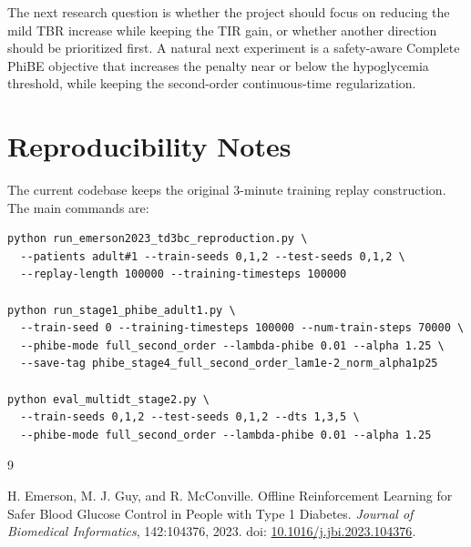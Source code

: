 \documentclass[11pt]{article}
\begin{document}
The next research question is whether the project should focus on reducing the mild TBR
increase while keeping the TIR gain, or whether another direction should be prioritized
first. A natural next experiment is a safety-aware Complete PhiBE objective that increases
the penalty near or below the hypoglycemia threshold, while keeping the second-order
continuous-time regularization.

\section{Reproducibility Notes}

The current codebase keeps the original 3-minute training replay construction. The main
commands are:
\begin{verbatim}
python run_emerson2023_td3bc_reproduction.py \
  --patients adult#1 --train-seeds 0,1,2 --test-seeds 0,1,2 \
  --replay-length 100000 --training-timesteps 100000

python run_stage1_phibe_adult1.py \
  --train-seed 0 --training-timesteps 100000 --num-train-steps 70000 \
  --phibe-mode full_second_order --lambda-phibe 0.01 --alpha 1.25 \
  --save-tag phibe_stage4_full_second_order_lam1e-2_norm_alpha1p25

python eval_multidt_stage2.py \
  --train-seeds 0,1,2 --test-seeds 0,1,2 --dts 1,3,5 \
  --phibe-mode full_second_order --lambda-phibe 0.01 --alpha 1.25
\end{verbatim}

\begin{thebibliography}{9}

\bibitem{emerson2023}
H. Emerson, M. J. Guy, and R. McConville.
\newblock Offline Reinforcement Learning for Safer Blood Glucose Control in People with Type 1 Diabetes.
\newblock \emph{Journal of Biomedical Informatics}, 142:104376, 2023.
\newblock doi: \href{https://doi.org/10.1016/j.jbi.2023.104376}{10.1016/j.jbi.2023.104376}.

\end{thebibliography}
\end{document}
